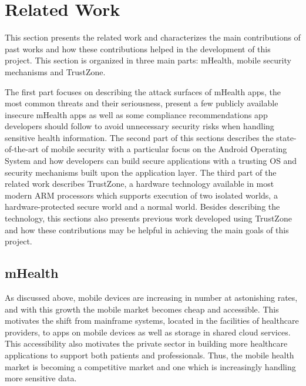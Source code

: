 
% 
% 
\section{Related Work}


This section presents the related work and characterizes the main contributions of past works and how these contributions helped in the development of this project. This section is organized in three main parts: mHealth, mobile security mechanisms and TrustZone.

The first part focuses on describing the attack surfaces of mHealth apps, the most common threats and their seriousness, present a few publicly available insecure mHealth apps as well as some compliance recommendations app developers should follow to avoid unnecessary security risks when handling sensitive health information. The second part of this sections describes the state-of-the-art of mobile security with a particular focus on the Android Operating System and how developers can build secure applications with a trusting \ac{OS} and security mechanisms built upon the application layer. The third part of the related work describes TrustZone, a hardware technology available in most modern \ac{ARM} processors which supports execution of two isolated worlds, a hardware-protected secure world and a normal world. Besides describing the technology, this sections also presents previous work developed using TrustZone and how these contributions may be helpful in achieving the main goals of this project. 

\subsection{mHealth}
\label{sec:mhealth}

As discussed above, mobile devices are increasing in number at astonishing rates, and with this growth the mobile market becomes cheap and accessible. This motivates the shift from mainframe systems, located in the facilities of healthcare providers, to apps on mobile devices as well as storage in shared cloud services. This accessibility also motivates the private sector in building more healthcare applications to support both patients and professionals. Thus, the mobile health market is becoming a competitive market and one which is increasingly handling more sensitive data.

